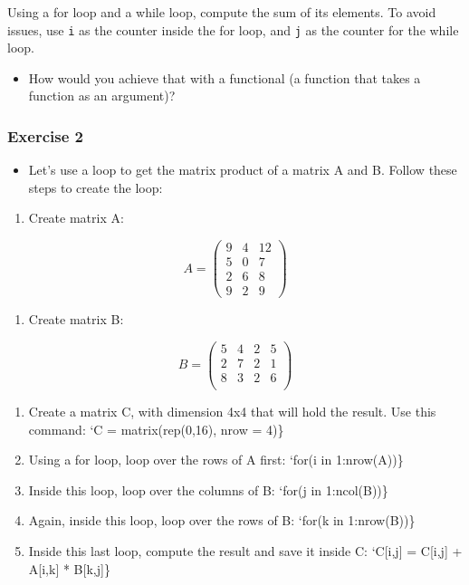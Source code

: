 \documentclass[]{gitbook}
\providecommand{\tightlist}{%
  \setlength{\itemsep}{0pt}\setlength{\parskip}{0pt}}
\theoremstyle{definition}
\theoremstyle{definition}
\theoremstyle{definition}
\theoremstyle{remark}
\begin{document}
Using a for loop and a while loop, compute the sum of its elements. To
avoid issues, use \texttt{i} as the counter inside the for loop, and
\texttt{j} as the counter for the while loop.

\begin{itemize}
\tightlist
\item
  How would you achieve that with a functional (a function that takes a
  function as an argument)?
\end{itemize}

\hypertarget{exercise-2-3}{%
\subsubsection*{Exercise 2}\label{exercise-2-3}}

\begin{itemize}
\tightlist
\item
  Let's use a loop to get the matrix product of a matrix A and B. Follow
  these steps to create the loop:
\end{itemize}

\begin{enumerate}
\def\labelenumi{\arabic{enumi})}
\tightlist
\item
  Create matrix A:
\end{enumerate}

\[A = \left(
  \begin{array}{ccc}
   9 & 4 & 12 \\
   5 & 0 & 7 \\
   2 & 6 & 8 \\
   9 & 2 & 9
  \end{array} \right)
\]

\begin{enumerate}
\def\labelenumi{\arabic{enumi})}
\setcounter{enumi}{1}
\tightlist
\item
  Create matrix B:
\end{enumerate}

\[B = \left(
\begin{array}{cccc}
 5 & 4 & 2 & 5 \\
 2 & 7 & 2 & 1 \\
 8 & 3 & 2 & 6 \\
\end{array} \right)
\]

\begin{enumerate}
\def\labelenumi{\arabic{enumi})}
\setcounter{enumi}{2}
\item
  Create a matrix C, with dimension 4x4 that will hold the result. Use
  this command: `C = matrix(rep(0,16), nrow = 4)\}
\item
  Using a for loop, loop over the rows of A first: `for(i in
  1:nrow(A))\}
\item
  Inside this loop, loop over the columns of B: `for(j in 1:ncol(B))\}
\item
  Again, inside this loop, loop over the rows of B: `for(k in
  1:nrow(B))\}
\item
  Inside this last loop, compute the result and save it inside C:
  `C{[}i,j{]} = C{[}i,j{]} + A{[}i,k{]} * B{[}k,j{]}\}
\end{enumerate}
\end{document}
